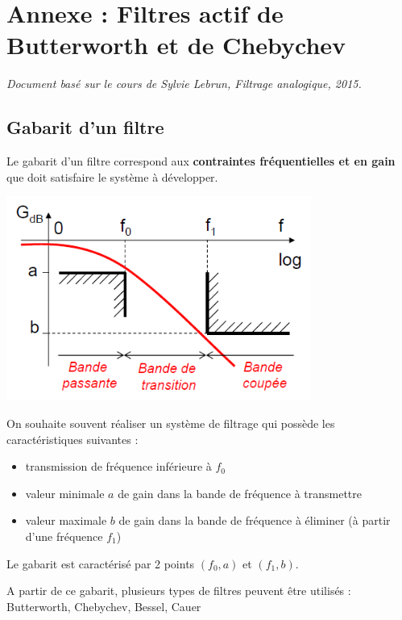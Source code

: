 \documentclass[a4paper,french]{paper}
\begin{document}



\newpage
\section*{Annexe : Filtres actif de \textbf{Butterworth} et de \textbf{Chebychev}}

\textit{Document basé sur le cours de Sylvie Lebrun, Filtrage analogique, 2015.}

\subsection*{Gabarit d'un filtre}

Le gabarit d'un filtre correspond aux \textbf{contraintes fréquentielles et en gain} que doit satisfaire le système à développer.

\begin{center}
	\includegraphics[width=10cm]{images/gabarit_filtre.png}
\end{center}

On souhaite souvent réaliser un système de filtrage qui possède les caractéristiques suivantes :
\begin{itemize}
	\item transmission de fréquence inférieure à $f_0$
	\item valeur minimale $a$ de gain dans la bande de fréquence à transmettre
	\item valeur maximale $b$ de gain dans la bande de fréquence à éliminer (à partir d'une fréquence $f_1$)
\end{itemize}

Le gabarit est caractérisé par 2 points $(f_0, a)$ et $(f_1, b)$.

\medskip

A partir de ce gabarit, plusieurs types de filtres peuvent être utilisés : Butterworth, Chebychev, Bessel, Cauer
\end{document}
